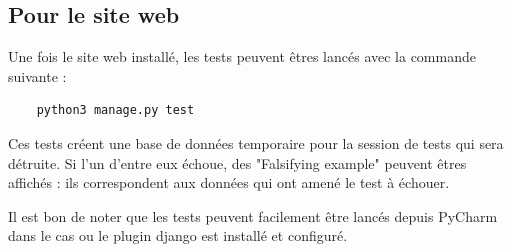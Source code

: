 \subsection{Pour le site web}

Une fois le site web installé, les tests peuvent êtres lancés avec la commande suivante :


\begin{verbatim}
    python3 manage.py test
\end{verbatim}

Ces tests créent une base de données temporaire pour la session de tests qui sera détruite. Si l'un d'entre eux échoue, des "Falsifying example" peuvent êtres affichés : ils correspondent aux données qui ont amené le test à échouer.

Il est bon de noter que les tests peuvent facilement être lancés depuis PyCharm dans le cas ou le plugin \Gls{django} est installé et configuré.
